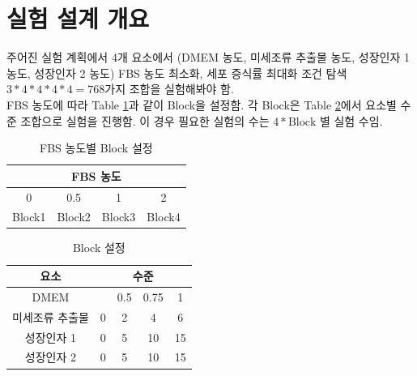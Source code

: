 \documentclass{article}
\author{lichen}
\date{\today}
\begin{document}
    \section{실험 설계 개요}
    주어진 실험 계획에서 4개 요소에서 (DMEM 농도, 미세조류 추출물 농도, 성장인자 1 농도, 성장인자 2 농도)
    FBS 농도 최소화, 세포 증식률 최대화 조건 탐색 
    $3*4*4*4*4 = 768$가지 조합을 실험해봐야 함.\\
    FBS 농도에 따라 Table \ref{table1}과 같이 Block을 설정함. 각 Block은 Table \ref{table2}에서 요소별 수준 조합으로 실험을 진행함.
    이 경우 필요한 실험의 수는 $4*\text{Block 별 실험 수}$임.
    \begin{table}[h]
        \centering
        \begin{tabular}{|c c c c|}
            \multicolumn{4}{|c|}{FBS 농도}\\
            \hline
            0 & 0.5 & 1 & 2\\
            Block1 & Block2 & Block3 & Block4\\
        \end{tabular}
        \caption{ FBS 농도별 Block 설정}
        \label{table1}
    \end{table}
    \begin{table}[h]
        \centering
        \begin{tabular}{|c c c c c|}
            요소&\multicolumn{4}{|c|}{수준}\\
            \hline
            DMEM &  & 0.5 & 0.75 & 1 \\
            미세조류 추출물 & 0 & 2 & 4 & 6 \\
            성장인자 1 & 0 & 5 & 10 & 15 \\
            성장인자 2 &  0 & 5 & 10 & 15 \\ 
        \end{tabular}
        \caption{ Block 설정}
        \label{table2}
    \end{table}
    \newpage
\end{document}
